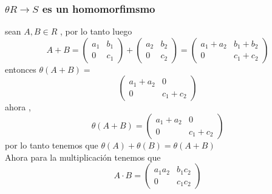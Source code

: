 \documentclass[10pt,a4paper]{article} %
\begin{document}
            \subsubsection{$ \theta R  \to S  $  es un homomorfimsmo}
                sean $ A,B \in R  $ , por lo tanto luego
                \begin{equation}
                    A+B = \begin{pmatrix}
                        a_1 & b_1
                        \\
                        0 & c_1
                    \end{pmatrix}
                    +
                    \begin{pmatrix}
                        a_2 & b_2
                        \\
                        0 & c_2
                    \end{pmatrix}
                    =
                    \begin{pmatrix}
                        a_1 +a_2 & b_1 + b_2
                        \\
                        0 & c_1 + c_2
                    \end{pmatrix}
                \end{equation}
                entonces $ \theta (A+B)  =  $
                \begin{equation}
                    \begin{pmatrix}
                        a_1 + a_2 & 0
                        \\
                        0 & c_1 + c_2
                    \end{pmatrix}
                \end{equation}
                ahora ,
                \begin{equation}
                    \theta (A+B) =
                    \begin{pmatrix}
                        a_1 + a_2 & 0
                        \\
                        0 & c_1 + c_2
                    \end{pmatrix}
                \end{equation}
                por lo tanto tenemos que $ \theta (A) + \theta  (B) = \theta (A+B)  $
                \\
                Ahora para la multiplicación tenemos que
                \begin{equation}
                    A \cdot B = \begin{pmatrix}
                        a_1 a_2 & b_1 c_2
                        \\
                        0 & c_1 c_2
                    \end{pmatrix}
                \end{equation}
\end{document}
